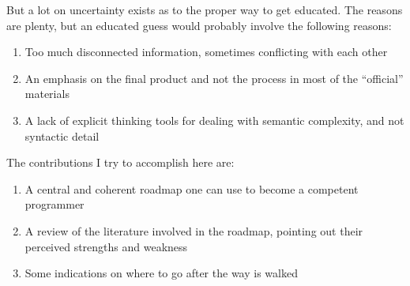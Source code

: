 But a lot on uncertainty exists as to the proper way to get educated. The
reasons are plenty, but an educated guess would probably involve the following
reasons:

\begin{enumerate}
    \item Too much disconnected information, sometimes conflicting with each other
    \item An emphasis on the final product and not the process in most of the
    ``official'' materials \cite{education:harvey__symbolic_programming_vs_AP_curriculum}
    \item A lack of explicit thinking tools for dealing with semantic
    complexity, and not syntactic detail\cite{education:felleisen__sicsc}
\end{enumerate}


The contributions I try to accomplish here are:

\begin{enumerate}
    \item A central and coherent roadmap one can use to become a competent
    programmer
    \item A review of the literature involved in the roadmap, pointing out their
    perceived strengths and weakness

    \item Some indications on where to go after the way is walked
\end{enumerate}

